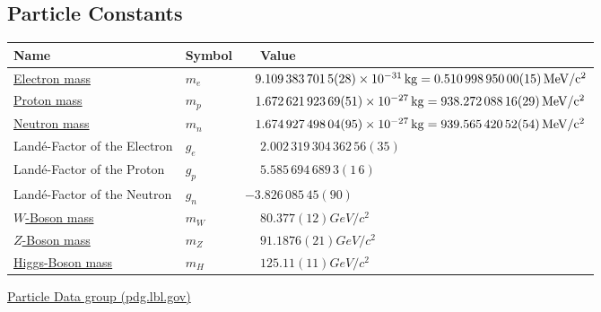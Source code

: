 	\subsection{Particle Constants}
		\label{Sec:ParticleConstants}
		\begin{center}
		\begin{tabular}{| L{.35\textwidth} L{.15\textwidth} L{.4\textwidth} |}
			\hline Name & Symbol & $\phantom{-}$Value \\ \hline \hline
			\href{https://en.wikipedia.org/wiki/Electron_mass}{Electron mass} & $m_e$ & $\phantom{-}9.109\,383\,701\,5(28)\times 10^{-31}\,\mathrm{kg} = 0.510\,998\,950\,00(15)\,\mathrm{MeV/c^2}$ \\ \hline
			\href{https://en.wikipedia.org/wiki/Proton}{Proton mass} & $m_p$ & $\phantom{-}1.672\,621\,923\,69(51)\times 10^{-27}\,\mathrm{kg} = 938.272\,088\,16(29)\,\mathrm{MeV/c^2}$ \\ \hline
			\href{https://en.wikipedia.org/wiki/Neutron}{Neutron mass} & $m_n$ & $\phantom{-}1.674\,927\,498\, 04(95)\times 10^{-27}\,\mathrm{kg} = 939.565\,420\,52(54)\,\mathrm{MeV/c^2}$ \\ \hline
			Landé-Factor of the Electron & $g_e$ & $\phantom{-}2.002\,319\,304\,362\,56(35)$ \\ \hline
			Landé-Factor of the Proton & $g_p$ & $\phantom{-}5.585\,694\,689\,3(1\,6)$ \\ \hline
			Landé-Factor of the Neutron & $g_n$ & $- 3.826\,085\,45(90)$ \\ \hline
			\href{https://en.wikipedia.org/wiki/W_and_Z_bosons#W_bosons}{$W$-Boson mass} & $m_W$ & $\phantom{-}80.377(12)\unit{GeV/c^2}$ \\ \hline
			\href{https://en.wikipedia.org/wiki/W_and_Z_bosons#W_bosons}{$Z$-Boson mass} & $m_Z$ & $\phantom{-}91.1876(21)\unit{GeV/c^2}$ \\ \hline
			\href{https://en.wikipedia.org/wiki/Higgs_boson}{Higgs-Boson mass} & $m_H$ & $\phantom{-}125.11(11)\unit{GeV/c^2}$ \\ \hline
		\end{tabular}
		\end{center}

		\href{https://pdg.lbl.gov/}{Particle Data group (pdg.lbl.gov)}



